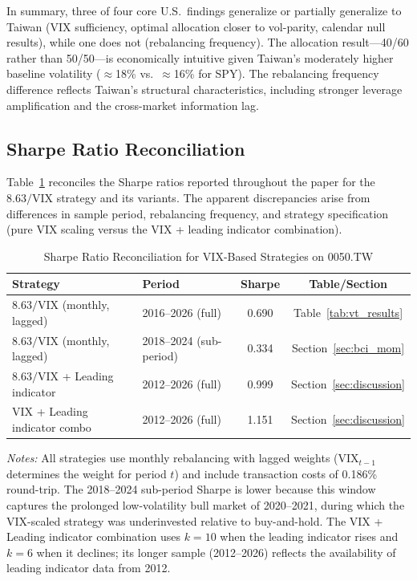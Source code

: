 In summary, three of four core U.S.\ findings generalize or partially generalize to Taiwan (VIX sufficiency, optimal allocation closer to vol-parity, calendar null results), while one does not (rebalancing frequency). The allocation result---40/60 rather than 50/50---is economically intuitive given Taiwan's moderately higher baseline volatility ($\approx$18\% vs.\ $\approx$16\% for SPY). The rebalancing frequency difference reflects Taiwan's structural characteristics, including stronger leverage amplification and the cross-market information lag.

\subsection{Sharpe Ratio Reconciliation}

Table~\ref{tab:sharpe_reconciliation} reconciles the Sharpe ratios reported throughout the paper for the $8.63/\text{VIX}$ strategy and its variants. The apparent discrepancies arise from differences in sample period, rebalancing frequency, and strategy specification (pure VIX scaling versus the VIX + leading indicator combination).

\begin{table}[H]
\centering
\caption{Sharpe Ratio Reconciliation for VIX-Based Strategies on 0050.TW}
\label{tab:sharpe_reconciliation}
\begin{tabular}{llcc}
\toprule
Strategy & Period & Sharpe & Table/Section \\
\midrule
$8.63/\text{VIX}$ (monthly, lagged) & 2016--2026 (full) & 0.690 & Table~\ref{tab:vt_results} \\
$8.63/\text{VIX}$ (monthly, lagged) & 2018--2024 (sub-period) & 0.334 & Section~\ref{sec:bci_mom} \\
$8.63/\text{VIX}$ + Leading indicator & 2012--2026 (full) & 0.999 & Section~\ref{sec:discussion} \\
VIX + Leading indicator combo & 2012--2026 (full) & 1.151 & Section~\ref{sec:discussion} \\
\bottomrule
\end{tabular}
\begin{flushleft}
\small \textit{Notes:} All strategies use monthly rebalancing with lagged weights (VIX$_{t-1}$ determines the weight for period $t$) and include transaction costs of 0.186\% round-trip. The 2018--2024 sub-period Sharpe is lower because this window captures the prolonged low-volatility bull market of 2020--2021, during which the VIX-scaled strategy was underinvested relative to buy-and-hold. The VIX + Leading indicator combination uses $k = 10$ when the leading indicator rises and $k = 6$ when it declines; its longer sample (2012--2026) reflects the availability of leading indicator data from 2012.
\end{flushleft}
\end{table}


